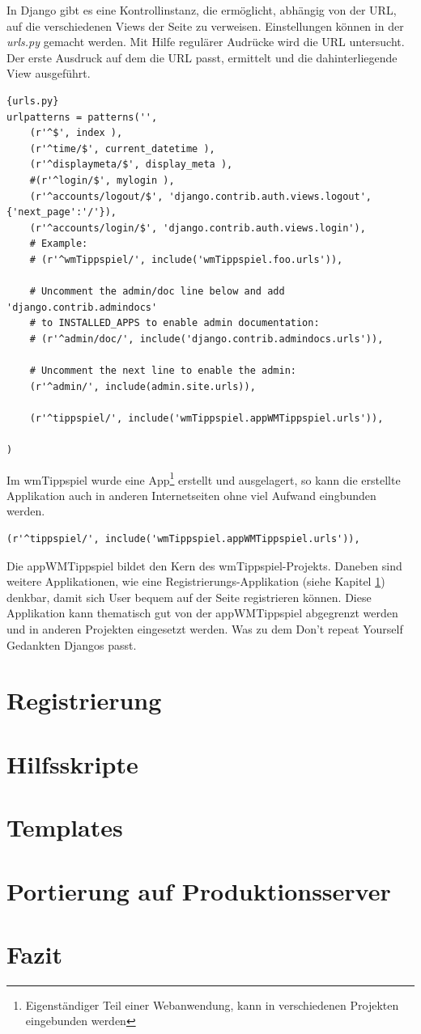 \documentclass[titlepage, 12pt,a4paper]{scrartcl}
\begin{document}
In Django gibt es eine Kontrollinstanz, die ermöglicht, abhängig von der URL,
auf die verschiedenen Views der Seite zu verweisen. Einstellungen können in der
\emph{urls.py} gemacht werden. Mit Hilfe regulärer Audrücke wird die URL
untersucht. Der erste Ausdruck auf dem die URL passt, ermittelt und
die dahinterliegende View ausgeführt.

\begin{lstlisting}[caption=Auszug ursl.py]{urls.py}
urlpatterns = patterns('',
    (r'^$', index ),
    (r'^time/$', current_datetime ),
    (r'^displaymeta/$', display_meta ),
    #(r'^login/$', mylogin ),
    (r'^accounts/logout/$', 'django.contrib.auth.views.logout', {'next_page':'/'}),
    (r'^accounts/login/$', 'django.contrib.auth.views.login'),
    # Example:
    # (r'^wmTippspiel/', include('wmTippspiel.foo.urls')),

    # Uncomment the admin/doc line below and add 'django.contrib.admindocs'
    # to INSTALLED_APPS to enable admin documentation:
    # (r'^admin/doc/', include('django.contrib.admindocs.urls')),

    # Uncomment the next line to enable the admin:
    (r'^admin/', include(admin.site.urls)),
    
    (r'^tippspiel/', include('wmTippspiel.appWMTippspiel.urls')),
    
)
\end{lstlisting}

Im wmTippspiel wurde eine App\footnote{Eigenständiger Teil einer Webanwendung,
kann in verschiedenen Projekten eingebunden werden} erstellt und ausgelagert, so
kann die erstellte Applikation auch in anderen Internetseiten ohne viel Aufwand 
eingbunden werden.

\begin{lstlisting}
(r'^tippspiel/', include('wmTippspiel.appWMTippspiel.urls')),
\end{lstlisting}

Die appWMTippspiel bildet den Kern des wmTippspiel-Projekts. Daneben sind
weitere Applikationen, wie eine Registrierungs-Applikation
(siehe Kapitel \ref{registrierung}) denkbar, damit sich User bequem auf der
Seite registrieren können. Diese Applikation kann thematisch gut von der appWMTippspiel abgegrenzt werden und in anderen Projekten eingesetzt
werden. Was zu dem Don't repeat Yourself Gedankten Djangos passt.  

\section{Registrierung}\label{registrierung}
\section{Hilfsskripte}\label{hilfsskripte}

\section{Templates}
\section{Portierung auf Produktionsserver}
\section{Fazit}
\end{document}
